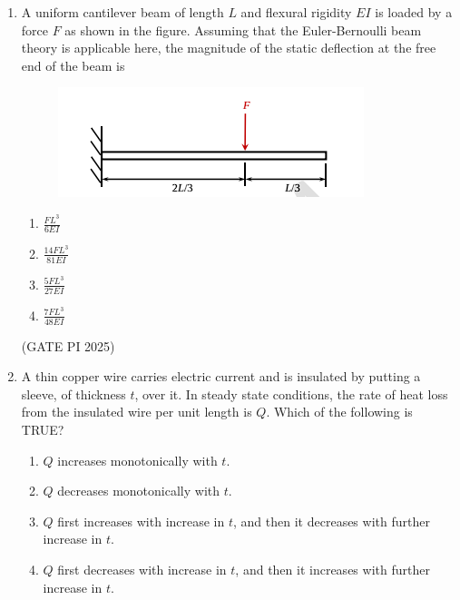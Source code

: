 \documentclass[journal,12pt,onecolumn]{IEEEtran}
\theoremstyle{remark}
\begin{document}
\begin{enumerate}
\begin{multicols}{4}
\begin{enumerate}
    \item $-100\pi$
    \item $-800\pi$
    \item $-400\pi$
    \item $400\pi$
\end{enumerate}
\end{multicols}

\hfill (GATE PI 2025)

\item A uniform cantilever beam of length $L$ and flexural rigidity $EI$ is loaded by a force $F$ as shown in the figure. Assuming that the Euler-Bernoulli beam theory is applicable here, the magnitude of the static deflection at the free end of the beam is

\begin{figure}[H]
\centering
\includegraphics[width=0.5\columnwidth]{fig5.png}
\caption{}
\end{figure}

\begin{multicols}{4}
\begin{enumerate}
    \item $\frac{FL^3}{6EI}$
    \item $ \frac{14FL^3}{81EI}$
    \item $\frac{5FL^3}{27EI}$
    \item $ \frac{7FL^3}{48EI}$
\end{enumerate}
\end{multicols}

\hfill (GATE PI 2025)

\item A thin copper wire carries electric current and is insulated by putting a sleeve, of thickness $t$, over it. In steady state conditions, the rate of heat loss from the insulated wire per unit length is $Q$. Which of the following is TRUE?

\begin{enumerate}
    \item $Q$ increases monotonically with $t$.
    \item $Q$ decreases monotonically with $t$.
    \item $Q$ first increases with increase in $t$, and then it decreases with further increase in $t$.
    \item $Q$ first decreases with increase in $t$, and then it increases with further increase in $t$.
\end{enumerate}


\end{enumerate}
\end{document}
